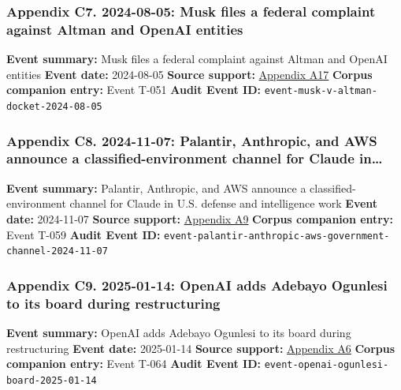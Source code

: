 \documentclass[
  american,
  11pt,
  letterpaper,
]{article}
\begin{document}
\subsubsection{Appendix C7. 2024-08-05: Musk files a federal complaint
against Altman and OpenAI
entities}\label{appendix-c7-2024-08-05-musk-files-a-federal-complaint-against-altman-and-openai-entities}

\textbf{Event summary:} Musk files a federal complaint against Altman
and OpenAI entities \textbf{Event date:} 2024-08-05 \textbf{Source
support:} \hyperref[appendix-a17-musk-v-altman-4-24-cv-04722]{Appendix
A17} \textbf{Corpus companion entry:} Event T-051 \textbf{Audit Event
ID:} \texttt{event-musk-v-altman-docket-2024-08-05}

\subsubsection{Appendix C8. 2024-11-07: Palantir, Anthropic, and AWS
announce a classified-environment channel for Claude
in\ldots{}}\label{appendix-c8-2024-11-07-palantir-anthropic-and-aws-announce-a-classified-environment-channel-for-claude-in-u-s-defense-and-intelligence-work}

\textbf{Event summary:} Palantir, Anthropic, and AWS announce a
classified-environment channel for Claude in U.S. defense and
intelligence work \textbf{Event date:} 2024-11-07 \textbf{Source
support:}
\hyperref[appendix-a9-anthropic-and-palantir-partner-to-bring-claude-ai-models-to-aws-for-u-s-government-intelligence-and-defense-operations]{Appendix
A9} \textbf{Corpus companion entry:} Event T-059 \textbf{Audit Event
ID:} \texttt{event-palantir-anthropic-aws-government-channel-2024-11-07}

\subsubsection{Appendix C9. 2025-01-14: OpenAI adds Adebayo Ogunlesi to
its board during
restructuring}\label{appendix-c9-2025-01-14-openai-adds-adebayo-ogunlesi-to-its-board-during-restructuring}

\textbf{Event summary:} OpenAI adds Adebayo Ogunlesi to its board during
restructuring \textbf{Event date:} 2025-01-14 \textbf{Source support:}
\hyperref[appendix-a6-openai-appoints-one-of-wall-street-s-most-powerful-dealmakers-to-its-board]{Appendix
A6} \textbf{Corpus companion entry:} Event T-064 \textbf{Audit Event
ID:} \texttt{event-openai-ogunlesi-board-2025-01-14}
\end{document}
